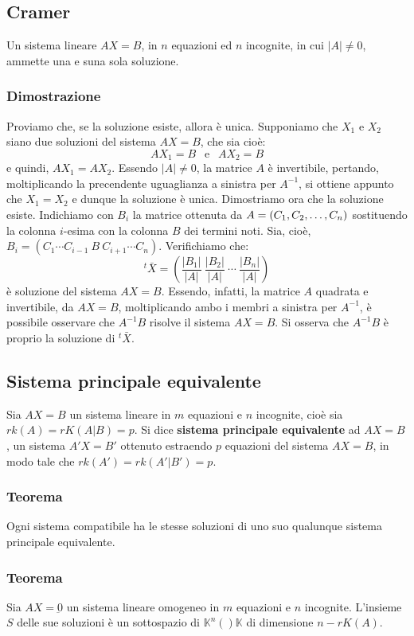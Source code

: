 \documentclass[../main.tex]{subfiles}
\begin{document}
\subsection{Cramer}
Un sistema lineare $AX=B$, in $n$ equazioni ed $n$ incognite, in cui $|A|\ne0$,
ammette una e suna sola soluzione.

\subsubsection{Dimostrazione}
Proviamo che, se la soluzione esiste, allora è unica. Supponiamo che $X_1$ e $
    X_2$ siano due soluzioni del sistema $AX = B$, che sia cioè:
\[
    AX_1 = B \ \ \text{ e } \ \ AX_2 = B
\]
e quindi, $AX_1=AX_2$. Essendo $|A|\ne0$, la matrice $A$ è invertibile,
pertando, moltiplicando la precendente uguaglianza a sinistra per $A^{-1}$, si
ottiene appunto che $X_1 = X_2$ e dunque la soluzione è unica. Dimostriamo ora
che la soluzione esiste. Indichiamo con $B_i$ la matrice ottenuta da $A =
    (C_1, C_2, \ldots, C_{n})$ sostituendo la colonna $i$-esima con la colonna $B$ dei termini
noti. Sia, cioè, $B_i = (C_{1}\cdots C_{i-1} \ B \ C_{i+1}\cdots C_n)$.
Verifichiamo che:
\[
    {^{t}\bar{X}} = \left(\dfrac{|B_1|}{|A|}\ \dfrac{|B_2|}{|A|}\ \cdots\ \dfrac{|B_n|}{|A|}\right)
\]
è soluzione del sistema $AX = B$. Essendo, infatti, la matrice $A$ quadrata e invertibile, da $AX = B$, moltiplicando ambo i membri a sinistra per $A^{-1}$, è possibile osservare che $A^{-1}B$ risolve il sistema $AX = B$. Si osserva che $A^{-1}B$ è proprio la soluzione di ${^{t}\bar{X}}$.

\subsection{Sistema principale equivalente}
Sia $AX = B$ un sistema lineare in $m$ equazioni e $n$ incognite, cioè sia $rk
    (A) = rK (A|B) = p$. Si dice \textbf{sistema principale equivalente} ad $AX =
    B$, un sistema $A'X = B'$ ottenuto estraendo $p$ equazioni del sistema $AX =
    B$, in modo tale che $rk (A') = rk (A'|B') = p$.

\subsubsection{Teorema}
Ogni sistema compatibile ha le stesse soluzioni di uno suo qualunque sistema
principale equivalente.

\subsubsection{Teorema}
Sia $AX = \underbar{0}$ un sistema lineare omogeneo in $m$ equazioni e $n$
incognite. L'insieme $S$ delle sue soluzioni è un sottospazio di $\mathbb{K}^n
    ()\mathbb{K}$ di dimensione $n-rK (A)$.
\end{document}

